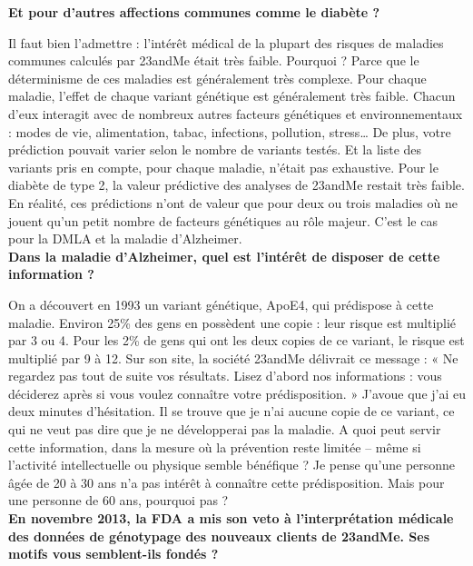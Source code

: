 \documentclass[8pt]{article}
\begin{document}
\textbf{Et pour d’autres affections communes comme le diabète ?}

Il faut bien l’admettre : l’intérêt médical de la plupart des risques de maladies communes calculés par 23andMe était très faible. Pourquoi ? Parce que le déterminisme de ces maladies est généralement très complexe. Pour chaque maladie, l’effet de chaque variant génétique est généralement très faible. Chacun d’eux interagit avec de nombreux autres facteurs génétiques et environnementaux : modes de vie, alimentation, tabac, infections, pollution, stress… De plus, votre prédiction pouvait varier selon le nombre de variants testés. Et la liste des variants pris en compte, pour chaque maladie, n’était pas exhaustive. Pour le diabète de type 2, la valeur prédictive des analyses de 23andMe restait très faible. En réalité, ces prédictions n’ont de valeur que pour deux ou trois maladies où ne jouent qu’un petit nombre de facteurs génétiques au rôle majeur. C’est le cas pour la DMLA et la maladie d’Alzheimer.\\

\textbf{Dans la maladie d’Alzheimer, quel est l’intérêt de disposer de cette information ?}

On a découvert en 1993 un variant génétique, ApoE4, qui prédispose à cette maladie. Environ 25\% des gens en possèdent une copie : leur risque est multiplié par 3 ou 4. Pour les 2\% de gens qui ont les deux copies de ce variant, le risque est multiplié par 9 à 12. Sur son site, la société 23andMe délivrait ce message : « Ne regardez pas tout de suite vos résultats. Lisez d’abord nos informations : vous déciderez après si vous voulez connaître votre prédisposition. » J’avoue que j’ai eu deux minutes d’hésitation. Il se trouve que je n’ai aucune copie de ce variant, ce qui ne veut pas dire que je ne développerai pas la maladie. A quoi peut servir cette information, dans la mesure où la prévention reste limitée – même si l’activité intellectuelle ou physique semble bénéfique ? Je pense qu’une personne âgée de 20 à 30 ans n’a pas intérêt à connaître cette prédisposition. Mais pour une personne de 60 ans, pourquoi pas ?\\

\textbf{En novembre 2013, la FDA a mis son veto à l’interprétation médicale des données de génotypage des nouveaux clients de 23andMe. Ses motifs vous semblent-ils fondés ?}
\end{document}
